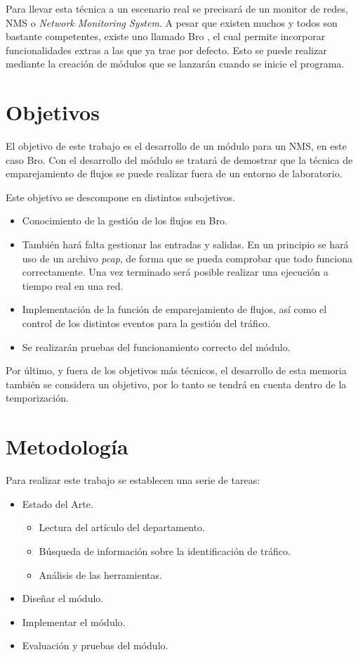 \intro Para llevar esta técnica a un escenario real se precisará de un monitor de redes, NMS o \textit{Network Monitoring System}. 
A pesar que existen muchos y todos son bastante competentes, existe uno llamado Bro \cite{broindex}, el cual permite 
incorporar funcionalidades extras a las que ya trae por defecto. Esto se puede realizar mediante la creación de módulos que se 
lanzarán cuando se inicie el programa.

\section{Objetivos}

El objetivo de este trabajo es el desarrollo de un módulo para un NMS, en este caso Bro. Con el desarrollo del módulo se tratará 
de demostrar que la técnica de emparejamiento de flujos se puede realizar fuera de un entorno de laboratorio.

\intro Este objetivo se descompone en distintos subojetivos.

\begin{itemize}
\item Conocimiento de la gestión de los flujos en Bro.
\item También hará falta gestionar las entradas y salidas. En un principio se hará uso de un archivo \textit{pcap}, de forma 
que se pueda comprobar que todo funciona correctamente. Una vez terminado será posible realizar una ejecución a tiempo real en una 
red.
\item Implementación de la función de emparejamiento de flujos, así como el control de los distintos eventos para la gestión del 
tráfico.
\item Se realizarán pruebas del funcionamiento correcto del módulo.
\end{itemize}

\intro Por último, y fuera de los objetivos más técnicos, el desarrollo de esta memoria también se considera un objetivo, por 
lo tanto se tendrá en cuenta dentro de la temporización.

\section{Metodología}

Para realizar este trabajo se establecen una serie de tareas:

\begin{itemize}
\item Estado del Arte.
	\begin{itemize}
	\item Lectura del artículo del departamento. \cite{comparacion}
	\item Búsqueda de información sobre la identificación de tráfico.
	\item Análisis de las herramientas.
	\end{itemize}
\item Diseñar el módulo.
\item Implementar el módulo.
\item Evaluación y pruebas del módulo.
\end{itemize}

